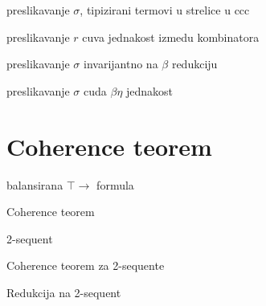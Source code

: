\begin{lema}
  preslikavanje $\sigma$, tipizirani termovi u strelice u ccc
\end{lema}

\begin{lema}
  preslikavanje $r$ cuva jednakost izmedu kombinatora
\end{lema}

\begin{lema}
  preslikavanje $\sigma$ invarijantno na $\beta$ redukciju
\end{lema}

\begin{lema}
  preslikavanje $\sigma$ cuda $\beta\eta$ jednakost
\end{lema}


\section{Coherence teorem}
\begin{definition}
  balansirana $\top \to$ formula
\end{definition}

\begin{teorem}
  Coherence teorem
\end{teorem}

\begin{definition}
  2-sequent
\end{definition}

\begin{teorem}
  Coherence teorem za 2-sequente
\end{teorem}

\begin{teorem}
  Redukcija na 2-sequent
\end{teorem}
